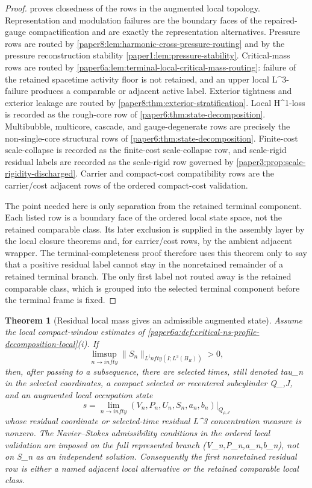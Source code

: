 \documentclass[11pt]{amsart}
\def\({}%
\def\){}%
\def\mathfrak#1{#1}%
\def\tau{tau}%
\def\infty{infty}%
\theoremstyle{plain}
\newtheorem{theorem}{Theorem}[section]
\theoremstyle{definition}
\theoremstyle{remark}
\begin{document}
\begin{proof}
 proves closedness of the rows in
the augmented local topology.  Representation and modulation failures are the
boundary faces of the repaired-gauge compactification and are exactly the
representation alternatives.  Pressure rows are routed by
\cref{paper8:lem:harmonic-cross-pressure-routing} and by the pressure
reconstruction stability \cref{paper1:lem:pressure-stability}.  Critical-mass
rows are routed by
\cref{paper6a:lem:terminal-local-critical-mass-routing}: failure of the
retained spacetime activity floor
is not retained, and an upper local \(L^3\)-failure produces a comparable or
adjacent active label.  Exterior tightness and exterior leakage are routed by
\cref{paper8:thm:exterior-stratification}.  Local \(H^1\)-loss is recorded as
the rough-core row of \cref{paper6:thm:state-decomposition}.  Multibubble,
multicore, cascade, and gauge-degenerate rows are precisely the non-single-core
structural rows of \cref{paper6:thm:state-decomposition}.  Finite-cost
scale-collapse is recorded as the finite-cost scale-collapse row, and
scale-rigid residual labels are recorded as the scale-rigid row governed by
\cref{paper3:prop:scale-rigidity-discharged}.  Carrier and compact-cost
compatibility rows are the carrier/cost adjacent rows of the ordered
compact-cost validation.
\par
The point needed here is only separation from the retained terminal component.
Each listed row is a boundary face of the ordered local state space, not the
retained comparable class.  Its later exclusion is supplied in the assembly
layer by the local closure theorems and, for carrier/cost rows, by the
ambient adjacent wrapper.  The terminal-completeness proof therefore uses this
theorem only to say that a positive residual label cannot stay in the
nonretained remainder of a retained terminal branch.  The only first label not
routed away is the retained comparable class, which is grouped into the
selected terminal component before the terminal frame is fixed.
\end{proof}

\begin{theorem}[Residual local mass gives an admissible augmented state]
\label{paper6a:thm:residual-mass-admissible-state}
Assume the local compact-window estimates of
\cref{paper6a:def:critical-ns-profile-decomposition-local}\textup{(i)}.  If
\[
  \limsup_{n\to\infty}\|S_n\|_{L^\infty(I;L^3(B_R))}>0,
\]
then, after passing to a subsequence, there are selected times, still denoted
\(\tau_n\) in the selected coordinates, a compact selected or recentered
subcylinder \(Q_{\rho,J}\), and an augmented local occupation state
\[
  \mathfrak s
  =
  \lim_{n\to\infty}
  (V_n,P_n,U_n,S_n,a_n,b_n)\big|_{Q_{\rho,J}}
\]
whose residual coordinate or selected-time residual \(L^3\) concentration
measure is nonzero.  The Navier--Stokes admissibility conditions in the ordered
local validation are imposed on the full represented branch
\((V_n,P_n,a_n,b_n)\), not on \(S_n\) as an independent solution.  Consequently
the first nonretained residual row is either a named adjacent local alternative
or the retained comparable local class.
\end{theorem}
\end{document}
